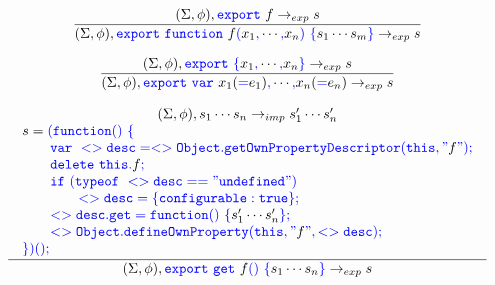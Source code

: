 \documentclass[a4paper]{article}
\newcommand{\code}[1]{\textcolor{blue}{\tt #1}}
\begin{document}
\begin{equation*}
\frac{
    (\Sigma, \phi), \code{export}\ f \rightarrow_{exp} s
}{
    (\Sigma, \phi), \code{export}\ \code{function}\ f\code{(} x_1 \code{,} \cdots \code{,} x_n \code{)}\ \code{\{} s_1 \cdots s_m \code{\}} \rightarrow_{exp} s
}
\end{equation*}

\begin{equation*}
\frac{
    (\Sigma, \phi), \code{export}\ \code{\{} x_1 \code{,} \cdots \code{,} x_n \code{\}} \rightarrow_{exp} s
}{
    (\Sigma, \phi), \code{export}\ \code{var}\ x_1 (\code{=} e_1) \code{,} \cdots \code{,} x_n (\code{=} e_n) \rightarrow_{exp} s
}
\end{equation*}

\begin{equation*}
\frac{
    \begin{array}{c}
    (\Sigma, \phi), s_1 \cdots s_n \rightarrow_{imp} s'_1 \cdots s'_n \\
    \begin{array}{l}
    s = \code{(} \code{function()}\ \code{\{} \\
    \qquad \code{var\ <>desc = <>Object.getOwnPropertyDescriptor(this, "}f\code{");} \\
    \qquad \code{delete\ this.}f\code{;} \\
    \qquad \code{if\ (typeof\ <>desc == "undefined")} \\
    \qquad\qquad \code{<>desc = \{ configurable: true \};} \\
    \qquad \code{<>desc.get = function()}\ \code{\{} s'_1 \cdots s'_n \code{\};} \\
    \qquad \code{<>Object.defineOwnProperty(this, "}f\code{", <>desc);} \\
    \code{\}} \code{)} \code{();} \\
    \end{array} \\
    \end{array}
}{
    (\Sigma, \phi), \code{export}\ \code{get}\ f\code{()}\ \code{\{} s_1 \cdots s_n \code{\}} \rightarrow_{exp} s
}
\end{equation*}
\end{document}
